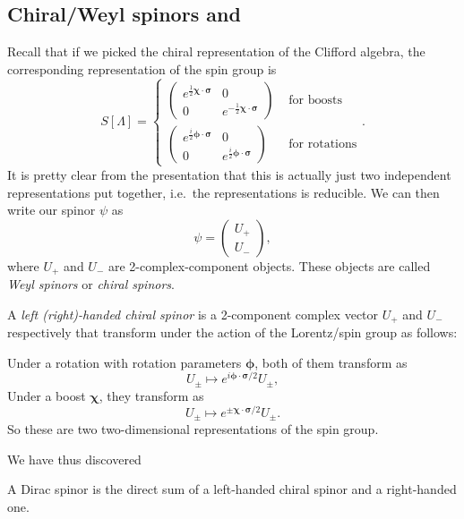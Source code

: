 \documentclass[a4paper]{article}
\begin{document}
\subsection{Chiral/Weyl spinors and }
Recall that if we picked the chiral representation of the Clifford algebra, the corresponding representation of the spin group is
\[
  S[\Lambda] =
  \begin{cases}
    \begin{pmatrix}
      e^{\frac{1}{2}\boldsymbol\chi\cdot \boldsymbol\sigma} & 0\\
      0 & e^{-\frac{1}{2} \boldsymbol\chi \cdot \boldsymbol\sigma}
    \end{pmatrix}& \text{ for boosts}\\
    \begin{pmatrix}
      e^{\frac{i}{2}\boldsymbol\phi\cdot \boldsymbol\sigma} & 0\\
      0 & e^{\frac{i}{2} \boldsymbol\phi \cdot \boldsymbol\sigma}
    \end{pmatrix}& \text{ for rotations}
  \end{cases}.
\]
It is pretty clear from the presentation that this is actually just two independent representations put together, i.e.\ the representations is reducible. We can then write our spinor $\psi$ as
\[
  \psi=
  \begin{pmatrix}
    U_+\\ U_-
  \end{pmatrix},
\]
where $U_+$ and $U_-$ are 2-complex-component objects. These objects are called \emph{Weyl spinors} or \emph{chiral spinors}.
\begin{defi}
  A \emph{left (right)-handed chiral spinor} is a 2-component complex vector $U_+$ and $U_-$ respectively that transform under the action of the Lorentz/spin group as follows:

  Under a rotation with rotation parameters $\boldsymbol\phi$, both of them transform as
  \[
    U_\pm \mapsto e^{i \boldsymbol\phi \cdot \boldsymbol\sigma/2} U_\pm,
  \]
  Under a boost $\boldsymbol\chi$, they transform as
  \[
    U_{\pm} \mapsto e^{\pm \boldsymbol\chi\cdot \boldsymbol\sigma/2} U_{\pm}.
  \]
  So these are two two-dimensional representations of the spin group.
\end{defi}
We have thus discovered
\begin{prop}
  A Dirac spinor is the direct sum of a left-handed chiral spinor and a right-handed one.
\end{prop}
\end{document}
